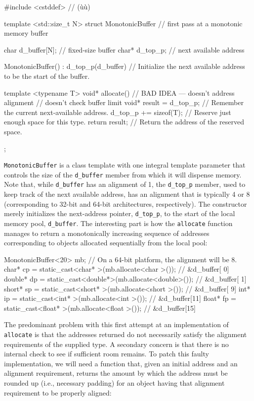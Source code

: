 \begin{emcppslisting}
#include <cstddef> // (ù{}ù)

template <std::size_t N>
struct MonotonicBuffer  // first pass at a monotonic memory buffer
{
    char  d_buffer[N];  // fixed-size buffer
    char* d_top_p;      //  next available address

    MonotonicBuffer() : d_top_p(d_buffer) { }
       // Initialize the next available address to be the start of the buffer.

    template <typename T>
    void* allocate()             // BAD IDEA --- doesn't address alignment
                                 // doesn't check buffer limit
    {
        void* result = d_top_p;  // Remember the current next-available address.
        d_top_p += sizeof(T);    // Reserve just enough space for this type.
        return result;           // Return the address of the reserved space.
    }
};
\end{emcppslisting}

\noindent \lstinline!MonotonicBuffer! is a class template with one integral template
parameter that controls the size of the \lstinline!d_buffer! member from
which it will dispense memory. Note that, while \lstinline!d_buffer! has
an alignment of 1, the \lstinline!d_top_p! member, used to keep track of
the next available address, has an alignment that is typically 4 or 8
(corresponding to 32-bit and 64-bit architectures, respectively). The
constructor merely initializes the next-address pointer,
\lstinline!d_top_p!, to the start of the local memory pool,
\lstinline!d_buffer!. The interesting part is how the \lstinline!allocate!
function manages to return a monotonically increasing sequence of addresses corresponding to
objects allocated sequentially from the local pool:

\begin{emcppslisting}
MonotonicBuffer<20> mb;  // On a 64-bit platform, the alignment will be 8.
char*   cp = static_cast<char*  >(mb.allocate<char  >());  // &d_buffer[ 0]
double* dp = static_cast<double*>(mb.allocate<double>());  // &d_buffer[ 1]
short*  sp = static_cast<short* >(mb.allocate<short >());  // &d_buffer[ 9]
int*    ip = static_cast<int*   >(mb.allocate<int   >());  // &d_buffer[11]
float*  fp = static_cast<float* >(mb.allocate<float >());  // &d_buffer[15]
\end{emcppslisting}

\noindent The predominant problem with this first attempt at an implementation of
\lstinline!allocate! is that the addresses returned do not necessarily
satisfy the alignment requirements of the supplied type. A
secondary concern is that there is no internal check to see if
sufficient room remains. To patch this faulty implementation,
we will need a function that, given an initial address and an alignment
requirement, returns the amount by which the address must be rounded up
(i.e., necessary padding) for an object having that alignment
requirement to be properly aligned:

